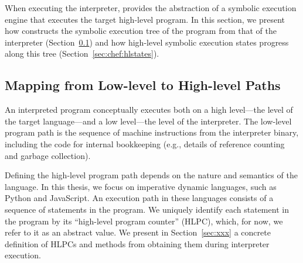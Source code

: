When executing the interpreter, \chef provides the abstraction of a symbolic execution engine that executes the target high-level program.
%
In this section, we present how \chef constructs the symbolic execution tree of the program from that of the interpreter (Section~\ref{sec:chef:ll2hl}) and how high-level symbolic execution states progress along this tree (Section~\ref{sec:chef:hlstates}).

\subsection{Mapping from Low-level to High-level Paths}
\label{sec:chef:ll2hl}


An interpreted program conceptually executes both on a high level---the level of the target language---and a low level---the level of the interpreter.
%
The low-level program path is the sequence of machine instructions from the interpreter binary, including the code for internal bookkeeping (e.g., details of reference counting and garbage collection).



Defining the high-level program path depends on the nature and semantics of the language.  In this thesis, we focus on imperative dynamic languages, such as Python and JavaScript.  An execution path in these languages consists of a sequence of statements in the program.  We uniquely identify each statement in the program by its ``high-level program counter'' (HLPC), which, for now, we refer to it as an abstract value.
%
We present in Section~\ref{sec:xxx} a concrete definition of HLPCs and methods from obtaining them during interpreter execution.



